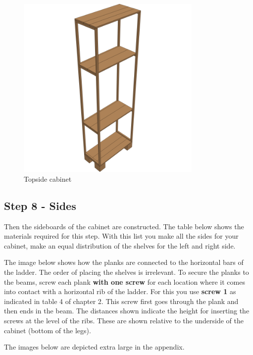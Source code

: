 \documentclass{article}
\begin{document}
\begin{figure}[h!]
    \centering
    \includegraphics[width=0.8\textwidth]{scene 7 - boven.png}
    \caption{Topside cabinet}
    \label{fig:stap 7}
\end{figure}

\clearpage
\newpage

\subsection{Step 8 - Sides}

Then the sideboards of the cabinet are constructed. The table below shows the materials required for this step. With this list you make all the sides for your cabinet, make an equal distribution of the shelves for the left and right side.



The image below shows how the planks are connected to the horizontal bars of the ladder. The order of placing the shelves is irrelevant. To secure the planks to the beams, screw each plank \textbf{with one screw} for each location where it comes into contact with a horizontal rib of the ladder. For this you use \textbf{screw 1} as indicated in table 4 of chapter 2. This screw first goes through the plank and then ends in the beam. The distances shown indicate the height for inserting the screws at the level of the ribs. These are shown relative to the underside of the cabinet (bottom of the legs).

The images below are depicted extra large in the appendix.
\end{document}
